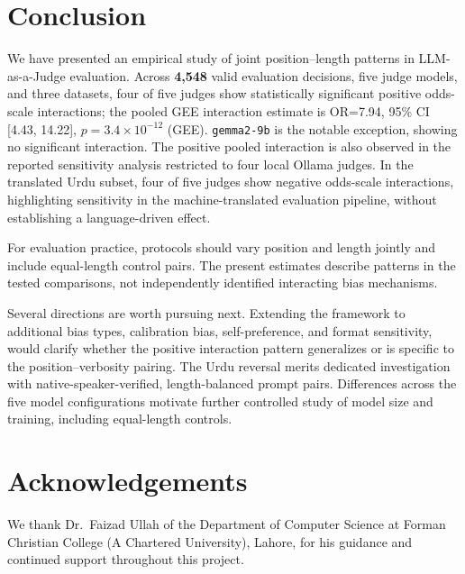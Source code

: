 \documentclass[10pt,conference]{IEEEtran}
\begin{document}
\section{Conclusion}
We have presented an empirical study of joint position--length patterns in LLM-as-a-Judge evaluation. Across \textbf{4,548} valid evaluation decisions, five judge models, and three datasets, four of five judges show statistically significant positive odds-scale interactions; the pooled GEE interaction estimate is OR=7.94, 95\% CI [4.43, 14.22], $p=3.4\times10^{-12}$ (GEE). \texttt{gemma2-9b} is the notable exception, showing no significant interaction. The positive pooled interaction is also observed in the reported sensitivity analysis restricted to four local Ollama judges. In the translated Urdu subset, four of five judges show negative odds-scale interactions, highlighting sensitivity in the machine-translated evaluation pipeline, without establishing a language-driven effect.

For evaluation practice, protocols should vary position and length jointly and include equal-length control pairs. The present estimates describe patterns in the tested comparisons, not independently identified interacting bias mechanisms.

Several directions are worth pursuing next. Extending the framework to additional bias types, calibration bias, self-preference, and format sensitivity, would clarify whether the positive interaction pattern generalizes or is specific to the position--verbosity pairing. The Urdu reversal merits dedicated investigation with native-speaker-verified, length-balanced prompt pairs. Differences across the five model configurations motivate further controlled study of model size and training, including equal-length controls.

\section*{Acknowledgements}
We thank Dr.\ Faizad Ullah of the Department of Computer Science at Forman Christian College (A Chartered University), Lahore, for his guidance and continued support throughout this project.
\end{document}
